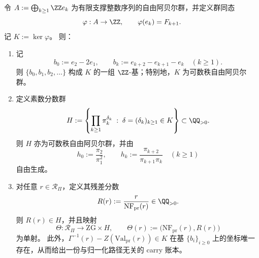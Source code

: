 \begin{theorem}\label{thm:prime-register-residual-ledger-group}
令 \(A:=\bigoplus_{k\ge1}\ZZ e_k\) 为有限支撑整数序列的自由阿贝尔群，并定义群同态
\[
\varphi:A\to\ZZ,
\qquad
\varphi(e_k)=F_{k+1}.
\]
记 \(K:=\ker\varphi\)。
则：
\begin{enumerate}
  \item 记
  \[
  b_0:=e_2-2e_1,
  \qquad
  b_k:=e_{k+2}-e_{k+1}-e_k\quad(k\ge1).
  \]
  则 \(\{b_0,b_1,b_2,\dots\}\) 构成 \(K\) 的一组 \(\ZZ\)-基；特别地，\(K\) 为可数秩自由阿贝尔群。

  \item 定义素数分数群
  \[
  H:=
  \left\{
  \prod_{k\ge1}\pi_k^{\delta_k}
  \;:\;
  \delta=(\delta_k)_{k\ge1}\in K
  \right\}\subset\QQ_{>0}.
  \]
  则 \(H\) 亦为可数秩自由阿贝尔群，并由
  \[
  h_0:=\frac{\pi_2}{\pi_1^2},
  \qquad
  h_k:=\frac{\pi_{k+2}}{\pi_{k+1}\pi_k}\quad(k\ge1)
  \]
  自由生成。

  \item 对任意 \(r\in\mathcal R_{\Pi}\)，定义其残差分数
  \[
  R(r):=\frac{r}{\mathrm{NF}_{\mathrm{pr}}(r)}\in\QQ_{>0}.
  \]
  则 \(R(r)\in H\)，并且映射
  \[
  \Theta:\mathcal R_{\Pi}\to \mathrm{ZG}\times H,
  \qquad
  \Theta(r):=\bigl(\mathrm{NF}_{\mathrm{pr}}(r),R(r)\bigr)
  \]
  为单射。
  此外，\(\Gamma^{-1}(r)-Z(\mathrm{Val}_{\mathrm{pr}}(r))\in K\) 在基 \(\{b_i\}_{i\ge0}\) 上的坐标唯一存在，从而给出一份与归一化路径无关的 carry 账本。
\end{enumerate}
\end{theorem}

